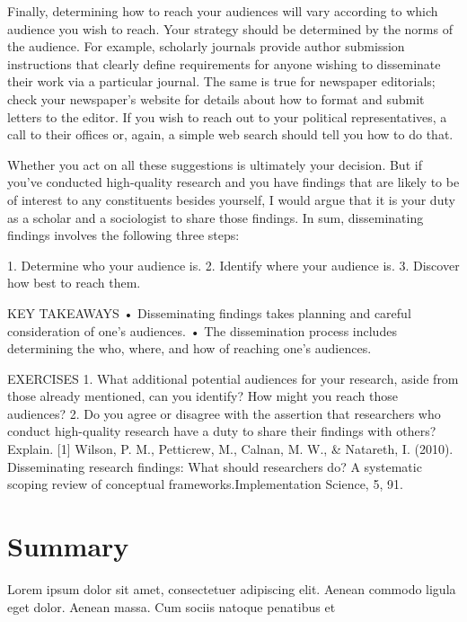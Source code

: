 Finally, determining how to reach your audiences will vary according to which audience you wish to reach. Your strategy should be determined by the norms of the audience. For example, scholarly journals provide author submission instructions that clearly define requirements for anyone wishing to disseminate their work via a particular journal. The same is true for newspaper editorials; check your newspaper’s website for details about how to format and submit letters to the editor. If you wish to reach out to your political representatives, a call to their offices or, again, a simple web search should tell you how to do that.

Whether you act on all these suggestions is ultimately your decision. But if you’ve conducted high-quality research and you have findings that are likely to be of interest to any constituents besides yourself, I would argue that it is your duty as a scholar and a sociologist to share those findings. In sum, disseminating findings involves the following three steps:

1. Determine who your audience is.
2. Identify where your audience is.
3. Discover how best to reach them.

KEY TAKEAWAYS
• Disseminating findings takes planning and careful consideration of one’s audiences.
• The dissemination process includes determining the who, where, and how of reaching one’s audiences.

EXERCISES
1. What additional potential audiences for your research, aside from those already mentioned, can you identify? How might you reach those audiences?
2. Do you agree or disagree with the assertion that researchers who conduct high-quality research have a duty to share their findings with others? Explain.
[1] Wilson, P. M., Petticrew, M., Calnan, M. W., \& Natareth, I. (2010). Disseminating research findings: What should researchers do? A systematic scoping review of conceptual frameworks.Implementation Science, 5, 91.


\section{Summary}\label{ch04:summary}

Lorem ipsum dolor sit amet, consectetuer adipiscing elit. Aenean commodo ligula eget dolor. Aenean massa. Cum sociis natoque penatibus et
